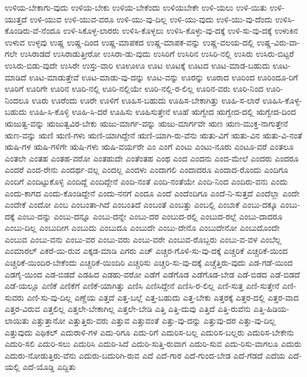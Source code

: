 {ಉಳಿಯ-ಬೇಕಾಗು-ವುದು
ಉಳಿಯ-ಬೇಕು
ಉಳಿಯ-ಬೇಕೆಂದು
ಉಳಿಯಬೇಕೇ
ಉಳಿ-ಯಲು
ಉಳಿ-ಯಿತು
ಉಳಿ-ಯುತ್ತದೆ
ಉಳಿ-ಯುವ
ಉಳಿ-ಯುವ-ವರೂ
ಉಳಿ-ಯು-ವು-ದಿಲ್ಲ
ಉಳಿ-ಯು-ವುದು
ಉಳಿ-ಯು-ವು-ದೆಂದು
ಉಳಿಸಿ-ಕೊಂಡಿರು-ವೆ-ನೆಂದೂ
ಉಳಿ-ಸಿಕೊಳ್ಳ-ಲಾರರು
ಉಳಿಸಿ-ಕೊಳ್ಳಲು
ಉಳಿಸಿ-ಕೊಳ್ಳು-ವು-ದಕ್ಕೆ
ಉಳಿ-ಸು-ವು-ದಕ್ಕೆ
ಉಳುಕಿನ
ಉಳುವ
ಉಳ್ಳವು
ಉಷ್ಣ
ಉಷ್ಣ-ದಿಂದ
ಉಷ್ಣ-ಮಾಪಕದ
ಉಷ್ಣ-ಮಾಪಕ-ವನ್ನು
ಉಷ್ಣ-ವಲಯ-ದಲ್ಲಿ
ಉಷ್ಣ-ವಿರು-ವಾ-ಗಲೇ
ಉಸಿರಾಡದೆ
ಉಸಿರಾಡುತ್ತೀರೋ
ಉಸಿರಾ-ಡು-ವುದು
ಉಸಿರಿಗೆ
ಉಸಿರಿನ
ಉಸಿರಿ-ನಲ್ಲಿ
ಉಸಿರು
ಉಸಿರು-ಬಿಟ್ಟರೆ
ಉಸಿರು-ಬಿಡು-ವುದೇ
ಉಸಿರೇ
ಉಸ್ತು-ವಾರಿ
ಊಊಊ
ಊಟ
ಊಟಕ್ಕೆ
ಊಟದ
ಊಟ-ಮಾಡ-ಬಹುದು
ಊಟ-ಮಾಡಿದೆ
ಊಟ-ಮಾಡುತ್ತೇವೆ
ಊಟ-ಮಾಡು-ವು-ದನ್ನು
ಊಟ-ವನ್ನು
ಊರನ್ನು
ಊರಾದ
ಊರಿಂದ
ಊರಿಂದೂ-ರಿಗೆ
ಊರಿಗೆ
ಊರಿಗೇ
ಊರಿನ
ಊರಿ-ನಲ್ಲಿ
ಊರಿ-ನಲ್ಲಿಯೇ
ಊರಿ-ನಲ್ಲಿ-ರ-ಲಿಲ್ಲ
ಊರಿನ-ವರು
ಊರಿ-ನಿಂದ
ಊರಿ-ನಿಂದಲೂ
ಊರು
ಊರೆಂದು
ಊರೇ
ಊಳಿಗೆ
ಊಹಿಸ-ಬಹುದು
ಊಹಿಸ-ಬೇಕಾಗಿತ್ತು
ಊಹಿ-ಸ-ಲಾರೆ
ಊಹಿಸಿ-ಕೊಳ್ಳ-ಬಹುದು
ಊಹಿ-ಸಿ-ಕೊಳ್ಳಿ
ಊಹಿ-ಸಿ-ದರೆ
ಊಹಿಸು
ಊಹಿಸುತ್ತೇನೆ
ಊಹೆ
ಋಗ್ವೇದ
ಋಗ್ವೇದ-ದಲ್ಲಿ
ಋಗ್ವೇದ-ದಿಂದ
ಋಜುತ್ವ-ವನ್ನು
ಋಜುತ್ವವಿರ-ಬೇಕು
ಋಜು-ಮಾರ್ಗ-ವನ್ನು
ಋಜು-ಮಾರ್ಗವೇ
ಋಣ
ಋಣ-ಮುಕ್ತ-ನಾಗುತ್ತೇನೆ
ಋಣ-ವನ್ನು
ಋಣಿ
ಋಣಿ-ಗಳು
ಋಣಿ-ಯಾಗಿದ್ದೇನೆ
ಋಣಿ-ಯಾಗಿ-ರು-ವೆನು
ಋತು-ವಿಗೆ
ಋತು-ವಿನ
ಋತು-ವಿ-ನಂತೆ
ಋಷಿ-ಗಳ
ಋಷಿ-ಗಳಿಗೇ
ಋಷಿ-ಗಳು
ಋಷಿ-ವರ್ಯರೇ
ಎಂ
ಎಂಗೆ
ಎಂಟು
ಎಂಟು-ನೂರು
ಎಂಟೂ-ವರೆ
ಎಂತಲೂ
ಎಂತಲೇ
ಎಂತಹ
ಎಂತಹ-ವರೋ
ಎಂತಹುದೇ
ಎಂತೆಂತಹ
ಎಂಥ
ಎಂದ
ಎಂದನು
ಎಂದ-ಮೇಲೆ
ಎಂದರು
ಎಂದರೂ
ಎಂದರೆ
ಎಂದ-ರೇನು
ಎಂದರ್ಥ-ವಲ್ಲ
ಎಂದಲ್ಲ
ಎಂದಳು
ಎಂದಾಗಲಿ
ಎಂದಾದರೂ
ಎಂದಾದ-ರೊಂದು
ಎಂದಿಗೂ
ಎಂದಿಗೆ
ಎಂದಿಟ್ಟುಕೊಳ್ಳಿ
ಎಂದಿದ್ದೆ
ಎಂದಿದ್ದೇನೆ
ಎಂದಿ-ನಂತೆ
ಎಂದಿ-ನಂತೆಯೇ
ಎಂದಿ-ನಿಂದ
ಎಂದಿರು-ವನು
ಎಂದು
ಎಂದು-ಕಾಗದ
ಎಂದು-ಕೊಂಡಿದ್ದೇನೆ
ಎಂದು-ನನಗೆ
ಎಂದೂ
ಎಂದೆ
ಎಂದೆಂದಿಗೂ
ಎಂದೆ-ನಿ-ಸುತ್ತದೆ
ಎಂದೆಲ್ಲಾ
ಎಂದೇ
ಎಂದೇಕೆ
ಎಂದೋ
ಎಂಬ
ಎಂಬಂತಾ-ಗಿದೆ
ಎಂಬಂತಿದೆ
ಎಂಬಂತೆ
ಎಂಬತ್ತು
ಎಂಬಲ್ಲಿ
ಎಂಬಾಕೆ
ಎಂಬು-ದಕ್ಕೂ
ಎಂಬು-ದಕ್ಕೆ
ಎಂಬು-ದನ್ನು
ಎಂಬು-ದನ್ನೂ
ಎಂಬು-ದನ್ನೇ
ಎಂಬು-ದರ
ಎಂಬುದ-ರಲ್ಲಿ
ಎಂಬುದ-ರಲ್ಲೆ
ಎಂಬು-ದಾದರೂ
ಎಂಬು-ದಿಲ್ಲ
ಎಂಬುದೀಗ
ಎಂಬುದು
ಎಂಬುದೂ
ಎಂಬುದೇ
ಎಂಬು-ದೇನೊ
ಎಂಬುದೇನೋ
ಎಂಬುದೊಂದೇ
ಎಂಬುವ
ಎಂಬು-ವನು
ಎಂಬು-ವರ
ಎಂಬು-ವರು
ಎಂಬು-ವರೇ
ಎಂಬುವ-ರೊಬ್ಬರು
ಎಂಬು-ವ-ವಳ
ಎಂಬೆಲ್ಲ
ಎಂಮಾರಲ್
ಎಕರೆ-ಯಿ-ರುವ
ಎಕ್ಕಡ-ಮಾಡಿ
ಎಗರು
ಎಚ್
ಎಚ್ಚರ-ಗೊಳಿ-ಸು-ವು-ದಕ್ಕೆ
ಎಚ್ಚರಿಕೆ
ಎಚ್ಚರಿಕೆ-ಯಿಂದ
ಎಚ್ಚರಿಕೆ-ಯಿಂದಿರ-ಬೇಕೆಂದು
ಎಚ್ಚರಿಕೆ-ಯಿಂದಿರಿ
ಎಚ್ಚರಿಸು
ಎಚ್ಚರಿ-ಸು-ವು-ದಕ್ಕೆ
ಎಚ್ಚೆತ್ತಿರು-ವುದು
ಎಡ-ಗಡೆ-ಯಿಂದ
ಎಡಗೈ-ಯಿಂದ
ಎಡ-ಬಿಡದೆ
ಎಡಹಿದ
ಎಡಹು-ವರೋ
ಎಡೆಗೆ
ಎಡೆಗೊಡ
ಎಡೆಗೊಡ-ಬೇಡ
ಎಡೆ-ಬಿಡದ
ಎಡೆ-ಬಿಡದೆ
ಎಡೆ-ಯಲ್ಲೂ
ಎಣಿಕೆ
ಎಣಿಕೆಗೆ
ಎಣಿಕೆ-ಯಾಗಿತ್ತು
ಎಣಿಸಿ
ಎಣಿಸಿದ್ದೇನೆ
ಎಣಿಸಿ-ರ-ಲಿಲ್ಲ
ಎಣಿ-ಸುತ್ತ
ಎಣಿ-ಸುತ್ತೇನೆ
ಎಣಿ-ಸುವರು
ಎಣಿ-ಸು-ವು-ದಿಲ್ಲ
ಎಣ್ಣೆಯ
ಎತ್ತದೆ
ಎತ್ತ-ಬಲ್ಲೆ
ಎತ್ತ-ಬಹುದು
ಎತ್ತ-ಬೇಕು
ಎತ್ತರಕ್ಕೆ
ಎತ್ತರ-ದಲ್ಲಿ
ಎತ್ತರ-ವಾದ
ಎತ್ತರ-ವಿರುವ
ಎತ್ತಲಿಲ್ಲ
ಎತ್ತಲೇ-ಬೇಕಾಗಿಲ್ಲ
ಎತ್ತಲೇ-ಬೇಡಿ
ಎತ್ತಿ
ಎತ್ತಿ-ದುವು
ಎತ್ತಿದೆ
ಎತ್ತಿ-ರುವೆನು
ಎತ್ತಿ-ಹಿಡಿಯ-ಲಾಯಿತು
ಎತ್ತುತ್ತಾನೋ
ಎತ್ತುತ್ತಿರು-ವರು
ಎತ್ತುವ
ಎತ್ತುವಂತೆ
ಎತ್ತು-ವು-ದನ್ನು
ಎತ್ತುವು-ದರ
ಎತ್ತು-ವು-ದಿಲ್ಲ
ಎತ್ತುವುದು
ಎಥಿಕಲ್
ಎದುರಾಳಿ-ಗಳ
ಎದು-ರಿಗೂ
ಎದು-ರಿಗೆ
ಎದುರಿಸ-ಬಲ್ಲ
ಎದುರಿಸ-ಬಲ್ಲರು
ಎದುರಿಸ-ಬೇಕೇನು
ಎದುರಿ-ಸಲಿ
ಎದುರಿ-ಸಲು
ಎದುರಿಸಿ
ಎದುರಿ-ಸಿದೆ
ಎದುರಿ-ಸುತ್ತಿ-ರುವಾಗ
ಎದುರಿ-ಸುವ
ಎದು-ರಿಸು-ವಾಗಲೂ
ಎದುರು
ಎದುರು-ನೋಡುತ್ತಿರು-ವೆನು
ಎದುರು-ಬದುರಿಗಿ-ರುವ
ಎದೆ
ಎದೆ-ಗಾರ
ಎದೆ-ಗುಂದ-ಬೇಡ
ಎದೆ-ಗೆಡದೆ
ಎದೆಯ
ಎದೆ-ಯಲ್ಲಿ
ಎದೆ-ಯೊಡ್ಡಿ
ಎದ್ದಿತು
}
